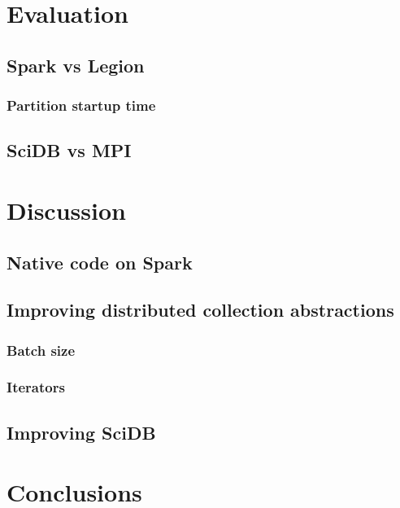 \documentclass[tog]{acmsiggraph}
\begin{document}
\section{Evaluation}

\subsection{Spark vs Legion}

\subsubsection{Partition startup time}

\subsection{SciDB vs MPI}

\section{Discussion}

\subsection{Native code on Spark}

\subsection{Improving distributed collection abstractions}

\subsubsection{Batch size}

\subsubsection{Iterators}

\subsection{Improving SciDB}

\section{Conclusions}


\nocite{*}

\end{document}
